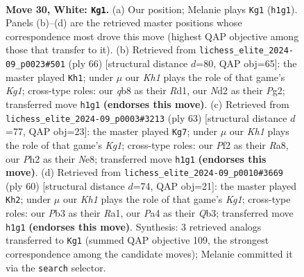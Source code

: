 \documentclass[11pt]{article}
\begin{document}
\begin{figure}[p]
\label{fig:thought-m56}
\end{figure}

\clearpage

\begin{figure}[p]\centering
\begin{subfigure}{0.46\textwidth}\centering
\resizebox{\linewidth}{!}{%
\newchessgame
\chessboard[
  setfen={1qb5/r4pkp/5np1/1p4N1/Pp6/1P4P1/3NRPBP/R6K w - - 0 30},
  showmover=false,
  pgfstyle=straightmove, color=movearrow, markmove={h1-g1}
]}
\caption{}
\end{subfigure}\hfill
\begin{subfigure}{0.46\textwidth}\centering
\resizebox{\linewidth}{!}{%
\newchessgame
\chessboard[
  setfen={4q3/1p4pk/1bnP3p/p4p2/P1B1p3/1P3P2/6PP/3RR1K1 w - - 1 34},
  showmover=false,
  pgfstyle=straightmove, color=movearrow, markmove={g1-h1}
]}
\caption{}
\end{subfigure}
\\[4pt]
\begin{subfigure}{0.46\textwidth}\centering
\resizebox{\linewidth}{!}{%
\newchessgame
\chessboard[
  setfen={r3n1k1/3n1p1p/6p1/r3p3/3PP3/pBQ3PP/R4PK1/8 b - - 3 32},
  showmover=false,
  pgfstyle=straightmove, color=movearrow, markmove={g8-g7}
]}
\caption{}
\end{subfigure}\hfill
\begin{subfigure}{0.46\textwidth}\centering
\resizebox{\linewidth}{!}{%
\newchessgame
\chessboard[
  setfen={r4bk1/5ppp/2q1p3/3p4/3P4/PQn1N1BP/5PP1/R5K1 w - - 0 31},
  showmover=false,
  pgfstyle=straightmove, color=movearrow, markmove={g1-h2}
]}
\caption{}
\end{subfigure}
\caption{\textbf{Move 30, White: \texttt{Kg1}.} (a) Our position; Melanie plays \texttt{Kg1} (\texttt{h1g1}). Panels (b)--(d) are the retrieved master positions whose correspondence most drove this move (highest QAP objective among those that transfer to it). (b) Retrieved from \texttt{lichess\_elite\_2024-09\_p0023\#501} (ply 66) [structural distance $d$=80, QAP obj=65]: the master played \texttt{Kh1}; under $\mu$ our \emph{Kh1} plays the role of that game's \emph{Kg1}; cross-type roles: our \emph{q}b8 as their \emph{R}d1, our \emph{N}d2 as their \emph{P}g2; transferred move \texttt{h1g1} \textbf{(endorses this move)}. (c) Retrieved from \texttt{lichess\_elite\_2024-09\_p0003\#3213} (ply 63) [structural distance $d$=77, QAP obj=23]: the master played \texttt{Kg7}; under $\mu$ our \emph{Kh1} plays the role of that game's \emph{Kg1}; cross-type roles: our \emph{P}f2 as their \emph{R}a8, our \emph{P}h2 as their \emph{N}e8; transferred move \texttt{h1g1} \textbf{(endorses this move)}. (d) Retrieved from \texttt{lichess\_elite\_2024-09\_p0010\#3669} (ply 60) [structural distance $d$=74, QAP obj=21]: the master played \texttt{Kh2}; under $\mu$ our \emph{Kh1} plays the role of that game's \emph{Kg1}; cross-type roles: our \emph{P}b3 as their \emph{R}a1, our \emph{P}a4 as their \emph{Q}b3; transferred move \texttt{h1g1} \textbf{(endorses this move)}. Synthesis: 3 retrieved analogs transferred to \texttt{Kg1} (summed QAP objective 109, the strongest correspondence among the candidate moves); Melanie committed it via the \texttt{search} selector.}

\end{figure}
\end{document}
